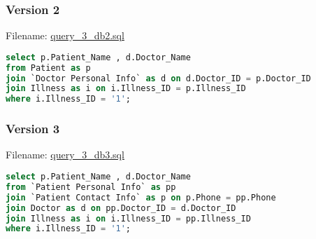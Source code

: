 \documentclass[12pt,arial]{article}
\begin{document}
\subsubsection{Version 2}
Filename: \url{query_3_db2.sql}
\begin{lstlisting}[language=SQL]
select p.Patient_Name , d.Doctor_Name
from Patient as p
join `Doctor Personal Info` as d on d.Doctor_ID = p.Doctor_ID
join Illness as i on i.Illness_ID = p.Illness_ID
where i.Illness_ID = '1';
\end{lstlisting}
\subsubsection{Version 3}
Filename: \url{query_3_db3.sql}
\begin{lstlisting}[language=SQL]
select p.Patient_Name , d.Doctor_Name
from `Patient Personal Info` as pp
join `Patient Contact Info` as p on p.Phone = pp.Phone
join Doctor as d on pp.Doctor_ID = d.Doctor_ID
join Illness as i on i.Illness_ID = pp.Illness_ID
where i.Illness_ID = '1';
\end{lstlisting}
\end{document}
